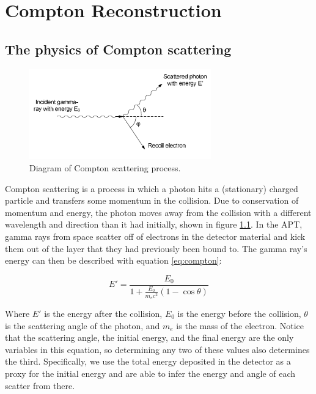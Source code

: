 %
\chapter{Compton Reconstruction}

\section{The physics of Compton scattering}

\begin{figure}
    \centering
    \includegraphics[width=0.7\textwidth]{Compton_scatter.png}
    \caption{Diagram of Compton scattering process. \cite{comptonThesis}}
    \label{fig:compton_scatter}
\end{figure}

Compton scattering is a process in which a photon hits a (stationary) charged particle and transfers some momentum in the collision. Due to conservation of momentum and energy, the photon moves away from the collision with a different wavelength and direction than it had initially, shown in figure \ref{fig:compton_scatter}. In the APT, gamma rays from space scatter off of electrons in the detector material and kick them out of the layer that they had previously been bound to. The gamma ray's energy can then be described with equation \ref{eq:compton}:

\begin{equation}
    \label{eq:compton}E' = \frac{E_0}{1+\frac{E_0}{m_ec^2}(1-\cos\theta)}
\end{equation}

Where $E'$ is the energy after the collision, $E_0$ is the energy before the collision, $\theta$ is the scattering angle of the photon, and $m_e$ is the mass of the electron. Notice that the scattering angle, the initial energy, and the final energy are the only variables in this equation, so determining any two of these values also determines the third. Specifically, we use the total energy deposited in the detector as a proxy for the initial energy and are able to infer the energy and angle of each scatter from there.

